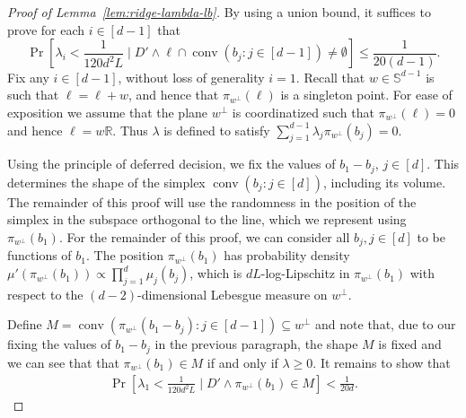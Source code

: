 \documentclass{theoretics}
\newcommand{\R}{\mathbb R}
\newcommand{\conv}{\operatorname{conv}}
\renewcommand{\subset}{\subseteq}
\begin{document}
\begin{proof}[Proof of Lemma~\ref{lem:ridge-lambda-lb}]
    By using a union bound, it suffices to prove for each $i \in [d-1]$ that
    \[
    \Pr[\lambda_i < \frac{1}{120d^2 L} \mid D' \wedge \ell \cap \conv(b_j : j\in [d-1]) \neq \emptyset ] \leq \frac{1}{20(d-1)}.
    \]
    Fix any $i \in [d - 1]$, without loss of generality $i=1$.
    Recall that $w \in \mathbb{S}^{d-1}$ is such that $\ell = \ell+w$, and hence that $\pi_{w^\perp}(\ell)$ is a singleton point.
    For ease of exposition we assume that the plane $w^\perp$ is coordinatized such that $\pi_{w^\perp}(\ell) = 0$
    and hence $\ell = w\R$.
    Thus $\lambda$ is defined to satisfy $\sum_{j=1}^{d-1} \lambda_j \pi_{w^\perp}(b_j) = 0$.

    Using the principle of deferred decision, we fix the values of $b_1 - b_j$, $j \in [d]$.
    This determines the shape of the simplex $\conv(b_j : j \in [d])$, including its volume.
    The remainder of this proof will use the randomness in the position of the simplex
    in the subspace orthogonal to the line, which we represent using $\pi_{w^\perp}(b_1)$.
    For the remainder of this proof, we can consider all $b_j, j \in [d]$
    to be functions of $b_1$.
    The position $\pi_{w^\perp}(b_1)$ has
    probability density $\mu'(\pi_{w^\perp}(b_1)) \propto \prod_{j=1}^d \mu_j(b_j)$, which is
    $dL$-log-Lipschitz in $\pi_{w^\perp}(b_1)$ with respect to the $(d-2)$-dimensional Lebesgue
    measure on $w^\perp$.

    Define $M = \conv(\pi_{w^\perp}(b_1 - b_j) : j \in [d-1]) \subset w^\perp$ and note that,
    due to our fixing the values of $b_1-b_j$ in the previous paragraph,
    the shape $M$ is fixed and we can see that
    that $\pi_{w^\perp}(b_1) \in M$ if and only if $\lambda \geq 0$.
    It remains to show that
    \begin{align}
        \Pr[\lambda_1 < \frac{1}{ 120d^2 L} \mid D' \wedge \pi_{w^\perp}(b_1) \in M] < \frac{1}{20d}. \label{eq:lambda-lb-goal}
    \end{align}


\end{proof}
\end{document}

